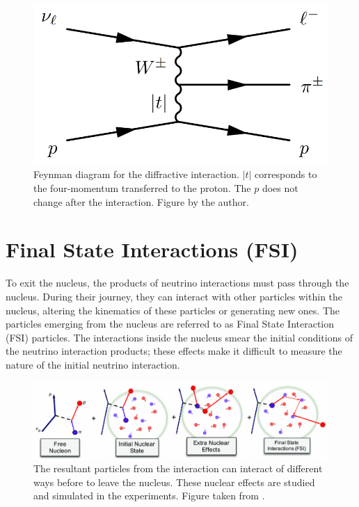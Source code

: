 \begin{figure}[!htb]
    \centering
    \includegraphics[scale=0.3]{Figures/Chapter1/DiffractiveFeynman.png}
    \caption{Feynman diagram for the diffractive interaction. $|t|$ corresponds to the four-momentum transferred to the proton. The $p$ does not change after the interaction. Figure by the author.} 
    \label{fig:Int:NuInteractions:Diffractive}
\end{figure}

\section{Final State Interactions (FSI)}
\label{Cap:Int:FSI}
To exit the nucleus, the products of neutrino interactions must pass through the nucleus. During their journey, they can interact with other particles within the nucleus, altering the kinematics of these particles or generating new ones. The particles emerging from the nucleus are referred to as Final State Interaction (FSI) particles. The interactions inside the nucleus smear the initial conditions of the neutrino interaction products; these effects make it difficult to measure the nature of the initial neutrino interaction. 

\begin{figure}[!htb]
    \centering
    \includegraphics[scale=0.35]{Figures/Chapter1/FSIProcess.png}
    \caption{The resultant particles from the interaction can interact of different ways before to leave the nucleus. These nuclear effects are studied and simulated in the experiments. Figure taken from \cite{FSIFigure}.}
    \label{fig:Int:FSI:FSIProcess}
\end{figure}


